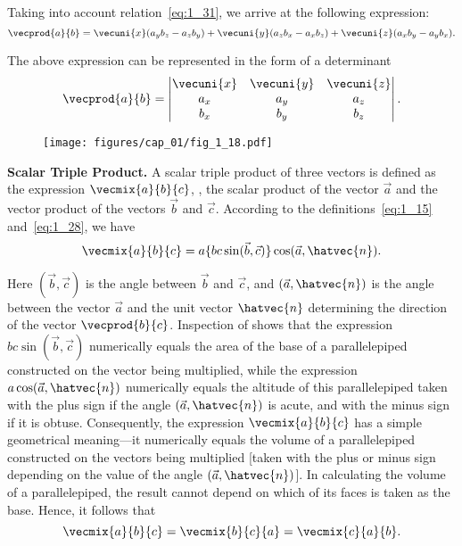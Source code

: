 \noindent
Taking into account relation~\eqref{eq:1_31}, we arrive at the following expression:
\begin{equation}\label{eq:1_32}
\vecprod{a}{b} = \vecuni{x}(a_yb_z - a_zb_y) + \vecuni{y}(a_zb_x - a_xb_z) + \vecuni{z}(a_xb_y - a_yb_x).
\end{equation}

\noindent
The above expression can be represented in the form of a determinant
\begin{equation}\label{eq:1_33}
\vecprod{a}{b} = \begin{vmatrix}
\vecuni{x} & \vecuni{y} & \vecuni{z}\\
a_x & a_y & a_z\\
b_x & b_y & b_z
\end{vmatrix}.
\end{equation}

\begin{figure}[t]
	\begin{center}
		\texttt{[image: figures/cap\_01/fig\_1\_18.pdf]}
		\caption[]{}
		\label{fig:1_18}
	\end{center}
	\vspace{-0.7cm}
\end{figure}

\textbf{Scalar Triple Product.} A scalar triple product of three vectors is defined as the expression $\vecmix{a}{b}{c}$, \ie, the scalar product of the vector $\vec{a}$ and the vector product of the vectors $\vec{b}$ and $\vec{c}$. According to the definitions~\eqref{eq:1_15} and~\eqref{eq:1_28}, we have
\begin{equation*}
\vecmix{a}{b}{c} = a\{bc\sin(\vec{b}, \vec{c})\}\cos(\vec{a},\hatvec{n}).
\end{equation*}

\noindent
Here $(\vec{b},\vec{c})$ is the angle between $\vec{b}$ and $\vec{c}$, and $(\vec{a},\hatvec{n})$ is the angle between the vector $\vec{a}$ and the unit vector $\hatvec{n}$ determining the direction of the vector $\vecprod{b}{c}$. Inspection of  shows that the expression $bc\sin(\vec{b},\vec{c})$ numerically equals the area of the base of a parallelepiped constructed on the vector being multiplied, while the expression $a\cos(\vec{a},\hatvec{n})$ numerically equals the altitude of this parallelepiped taken with the plus sign if the angle $(\vec{a},\hatvec{n})$ is acute, and with the minus sign if it is obtuse. Consequently, the expression $\vecmix{a}{b}{c}$ has a simple geometrical meaning---it numerically equals the volume of a parallelepiped constructed on the vectors being multiplied [taken with the plus or minus sign depending on the value of the angle $(\vec{a},\hatvec{n})$]. In calculating the volume of a parallelepiped, the result cannot depend on which of its faces is taken as the base. Hence, it follows that
\begin{equation}\label{eq:1_34}
\vecmix{a}{b}{c} = \vecmix{b}{c}{a} = \vecmix{c}{a}{b}.
\end{equation}

